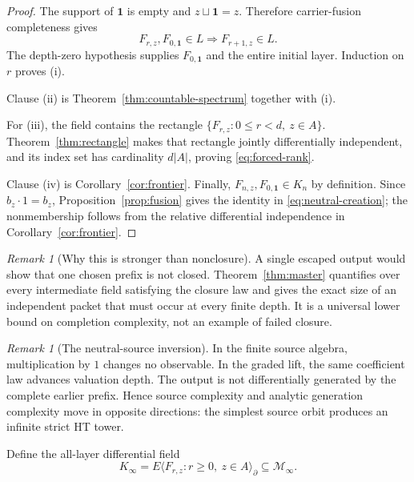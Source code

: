 \documentclass[11pt]{article}
\theoremstyle{definition}
\theoremstyle{remark}
\newtheorem{remark}[theorem]{Remark}
\newcommand{\cM}{\mathcal M}
\newcommand{\diff}{\partial}
\begin{document}
\begin{proof}
The support of \(\mathbf1\) is empty and \(z\sqcup\mathbf1=z\).  Therefore
carrier-fusion completeness gives
\[
 F_{r,z},F_{0,\mathbf1}\in L\Longrightarrow F_{r+1,z}\in L.
\]
The depth-zero hypothesis supplies \(F_{0,\mathbf1}\) and the entire initial layer.  Induction on
\(r\) proves \textup{(i)}.

Clause \textup{(ii)} is Theorem~\ref{thm:countable-spectrum} together with \textup{(i)}.

For \textup{(iii)}, the field contains the rectangle
\(\{F_{r,z}:0\leq r<d,\ z\in A\}\).  Theorem~\ref{thm:rectangle} makes that rectangle jointly
differentially independent, and its index set has cardinality
\(d|A|\), proving \eqref{eq:forced-rank}.

Clause \textup{(iv)} is Corollary~\ref{cor:frontier}.  Finally,
\(F_{n,z},F_{0,\mathbf1}\in K_n\) by definition.  Since \(b_z\cdot1=b_z\),
Proposition~\ref{prop:fusion} gives the identity in \eqref{eq:neutral-creation}; the
nonmembership follows from the relative differential independence in
Corollary~\ref{cor:frontier}.
\end{proof}

\begin{remark}[Why this is stronger than nonclosure]\label{rem:nonclosure}
A single escaped output would show that one chosen prefix is not closed.  Theorem~\ref{thm:master}
quantifies over every intermediate field satisfying the closure law and gives the exact size of an
independent packet that must occur at every finite depth.  It is a universal lower bound on
completion complexity, not an example of failed closure.
\end{remark}

\begin{remark}[The neutral-source inversion]\label{rem:inversion}
In the finite source algebra, multiplication by \(1\) changes no observable.  In the graded lift,
the same coefficient law advances valuation depth.  The output is not differentially generated
by the complete earlier prefix.  Hence source complexity and analytic generation complexity move
in opposite directions: the simplest source orbit produces an infinite strict HT tower.
\end{remark}

Define the all-layer differential field
\begin{equation}\label{eq:infinite-completion}
 K_\infty=E\langle F_{r,z}:r\geq0,\ z\in A\rangle_{\diff}
 \subseteq\cM_\infty.
\end{equation}
\end{document}
